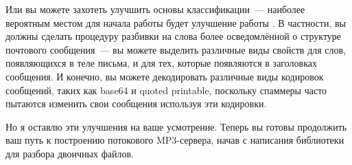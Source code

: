 Или вы можете захотеть улучшить основы классификации~--- наиболее вероятным местом для
начала работы будет улучшение работы .  В частности, вы должны
сделать процедуру разбивки на слова более осведомлённой о структуре почтового сообщения~---
вы можете выделить различные виды свойств для слов, появляющихся в теле письма, и для тех,
которые появляются в заголовках сообщения.  И конечно, вы можете декодировать различные
виды кодировок сообщений, таких как base64 и quoted printable, поскольку спаммеры часто
пытаются изменить свои сообщения используя эти кодировки.

Но я оставлю эти улучшения на ваше усмотрение.  Теперь вы готовы продолжить ваш путь к
построению потокового MP3-сервера, начав с написания библиотеки для разбора двоичных
файлов.

